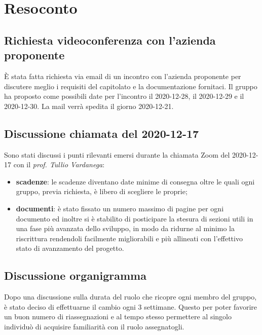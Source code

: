 \newpage


\section{Resoconto}

\subsection{Richiesta videoconferenza con l'azienda proponente}

È stata fatta richiesta via email di un incontro con l'azienda proponente \newline
per discutere meglio i requisiti del capitolato \NomeProgetto{} \newline
e la documentazione fornitaci.\newline
Il gruppo ha proposto come possibili date per l'incontro il 2020-12-28, il 2020-12-29 e il 2020-12-30.\newline
La mail verrà spedita il giorno 2020-12-21.

\subsection{Discussione chiamata del 2020-12-17}

Sono stati discussi i punti rilevanti emersi durante la chiamata Zoom del 2020-12-17 \newline
con il \textit{prof. Tullio Vardanega}:
\begin{itemize}
	\item \textbf{scadenze}: le scadenze diventano date minime di consegna oltre le quali ogni gruppo, previa richiesta, è libero di scegliere le proprie;
	\item \textbf{documenti}: è stato fissato un numero massimo di pagine per ogni documento ed inoltre si è stabilito di posticipare la stesura di sezioni utili in una fase più avanzata dello sviluppo, in modo da ridurne al minimo la riscrittura rendendoli facilmente migliorabili e più allineati con l'effettivo stato di avanzamento del progetto.
\end{itemize}

\subsection{Discussione organigramma}

Dopo una discussione sulla durata del ruolo che ricopre ogni membro del gruppo, è stato deciso di effettuarne il cambio ogni 3 settimane.
Questo per poter favorire un buon numero di riassegnazioni e al tempo stesso permettere al singolo individuò di acquisire familiarità con il ruolo assegnatogli.

